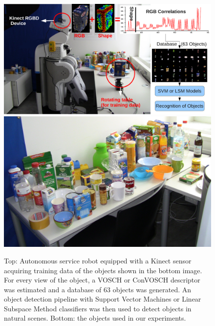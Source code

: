 \documentclass[a4paper, 10 pt, conference]{sty/ieeeconf}
\begin{document}
\begin{figure}[tb!]
  \begin{center}
    \includegraphics[width=.99\columnwidth]{figures/firstpage/firstpage.pdf}
    \includegraphics[width=.99\columnwidth]{figures/objects/objects_s.jpg}
    \caption{Top: Autonomous service robot equipped with a Kinect sensor
    acquiring training data of the objects shown in the bottom image. For 
  every view of the object, a VOSCH or ConVOSCH descriptor was estimated and a database
of 63 objects was generated. An object detection pipeline with Support Vector
Machines or Linear Subspace Method classifiers was then used to detect objects
in natural scenes. Bottom: the objects used in our experiments.}
\vspace{-3ex}
    \label{fig:robot}
  \end{center}
\end{figure}
\end{document}
